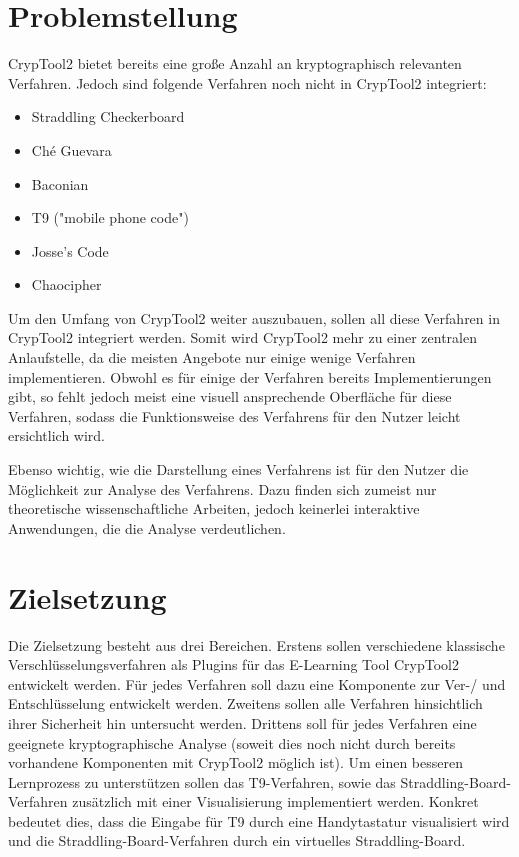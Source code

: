\documentclass[fontsize=11pt, paper=a4, parskip=half]{scrartcl}
\begin{document}
\section{Problemstellung}
CrypTool2 bietet bereits eine große Anzahl an kryptographisch relevanten Verfahren. Jedoch sind folgende Verfahren noch nicht in CrypTool2 integriert:
\begin{itemize}
	\item{Straddling Checkerboard}
	\item{Ché Guevara }
	\item{Baconian}
	\item{T9 ("mobile phone code")}
	\item{Josse's Code}
	\item{Chaocipher}
\end{itemize}

Um den Umfang von CrypTool2 weiter auszubauen, sollen all diese Verfahren in CrypTool2 integriert werden. Somit wird CrypTool2 mehr zu einer zentralen Anlaufstelle, da die meisten Angebote nur einige wenige Verfahren implementieren. Obwohl es für einige der Verfahren bereits Implementierungen gibt, so fehlt jedoch meist eine visuell ansprechende Oberfläche für diese Verfahren, sodass die Funktionsweise des Verfahrens für den Nutzer leicht ersichtlich wird.

Ebenso wichtig, wie die Darstellung eines Verfahrens ist für den Nutzer die Möglichkeit zur Analyse des Verfahrens. Dazu finden sich zumeist nur theoretische wissenschaftliche Arbeiten, jedoch keinerlei interaktive Anwendungen, die die Analyse verdeutlichen.

\section{Zielsetzung}
Die Zielsetzung besteht aus drei Bereichen. Erstens sollen verschiedene klassische Verschlüsselungsverfahren als Plugins für das E-Learning Tool CrypTool2 entwickelt werden. Für jedes Verfahren soll dazu eine Komponente zur Ver-/ und Entschlüsselung entwickelt werden. Zweitens sollen alle Verfahren hinsichtlich ihrer Sicherheit hin untersucht werden. Drittens soll für jedes Verfahren eine geeignete kryptographische Analyse  (soweit dies noch nicht durch bereits vorhandene Komponenten mit CrypTool2 möglich ist). Um einen besseren Lernprozess zu unterstützen sollen das T9-Verfahren, sowie das Straddling-Board-Verfahren zusätzlich mit einer Visualisierung implementiert werden. Konkret bedeutet dies, dass die Eingabe für T9 durch eine Handytastatur visualisiert wird und die Straddling-Board-Verfahren durch ein virtuelles Straddling-Board.
\end{document}
